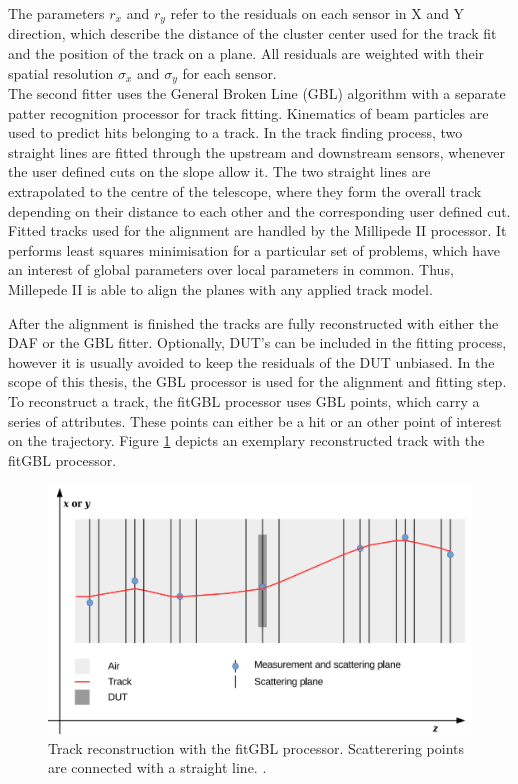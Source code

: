 The parameters $r_x$ and $r_y$ refer to the residuals on each sensor in X and Y direction, which describe the distance of the cluster center used for the track fit and the
position of the track on a plane. All residuals are weighted with their spatial resolution $\sigma_x$ and $\sigma_y$ for each sensor. \\
The second fitter uses the General Broken Line (GBL) algorithm with a separate patter recognition processor for track fitting. Kinematics of
beam particles are used to predict hits belonging to a track. In the track finding process, two straight lines are fitted through the upstream and
downstream sensors, whenever the user defined cuts on the slope allow it. The two straight lines are extrapolated to the centre of the telescope, where
they form the overall track depending on their distance to each other and the corresponding user defined cut.\\
Fitted tracks used for the alignment are handled by the Millipede II processor. It performs least squares minimisation for a particular set of problems, which
have an interest of global parameters over local parameters in common. Thus, Millepede II is able to align the planes with any applied track model.

After the alignment is finished the tracks are fully reconstructed with either the DAF or the GBL fitter. Optionally, DUT's can be included in the fitting
process, however it is usually avoided to keep the residuals of the DUT unbiased. In the scope of this thesis, the GBL processor is used for the
alignment and fitting step. To reconstruct a track, the fitGBL processor uses GBL points, which carry a series of attributes. These points can either be a
hit or an other point of interest on the trajectory. Figure \ref{fig:gbl} depicts an exemplary reconstructed track with the fitGBL processor.

\begin{figure}
  \centering
  \includegraphics[height=0.5\textwidth]{images/gbl.png}
  \caption{Track reconstruction with the fitGBL processor. Scatterering points are connected with a straight line. \cite{gbl}.}
  \label{fig:gbl}
\end{figure}



